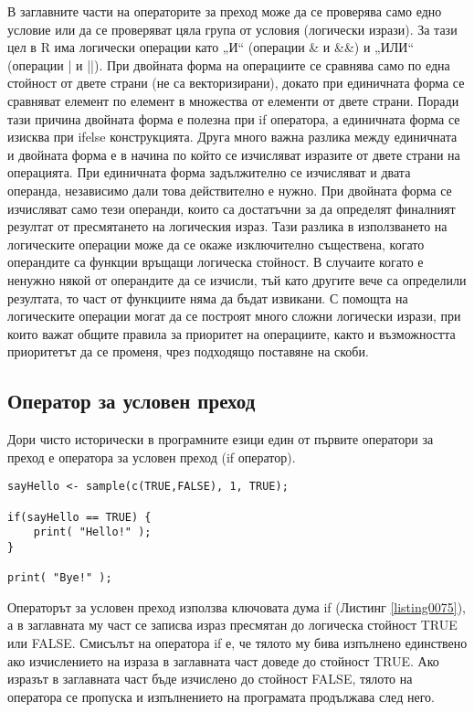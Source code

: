 В заглавните части на операторите за преход може да се проверява само едно условие или да се проверяват цяла група от условия (логически изрази). За тази цел в R има логически операции като „И“ (операции \& и \&\&) и „ИЛИ“ (операции | и ||). При двойната форма на операциите се сравнява само по една стойност от двете страни (не са векторизирани), докато при единичната форма се сравняват елемент по елемент в множества от елементи от двете страни. Поради тази причина двойната форма е полезна при if оператора, а единичната форма се изисква при ifelse конструкцията. Друга много важна разлика между единичната и двойната форма е в начина по който се изчисляват изразите от двете страни на операцията. При единичната форма задължително се изчисляват и двата операнда, независимо дали това действително е нужно. При двойната форма се изчисляват само тези операнди, които са достатъчни за да определят финалният резултат от пресмятането на логическия израз. Тази разлика в използването на логическите операции може да се окаже изключително съществена, когато операндите са функции връщащи логическа стойност. В случаите когато е ненужно някой от операндите да се изчисли, тъй като другите вече са определили резултата, то част от функциите няма да бъдат извикани. С помощта на логическите операции могат да се построят много сложни логически изрази, при които важат общите правила за приоритет на операциите, както и възможността приоритетът да се променя, чрез подходящо поставяне на скоби.

\subsection{Оператор за условен преход}

Дори чисто исторически в програмните езици един от първите оператори за преход е оператора за условен преход (if оператор).

\begin{lstlisting}[caption=Оператор за условен преход if, label=listing0075]
sayHello <- sample(c(TRUE,FALSE), 1, TRUE);

if(sayHello == TRUE) {
	print( "Hello!" );
}

print( "Bye!" );
\end{lstlisting}

Операторът за условен преход използва ключовата дума if (Листинг \ref{listing0075}), а в заглавната му част се записва израз пресмятан до логическа стойност TRUE или FALSE. Смисълът на оператора if е, че тялото му бива изпълнено единствено ако изчислението на израза в заглавната част доведе до стойност TRUE. Ако изразът в заглавната част бъде изчислено до стойност FALSE, тялото на оператора се пропуска и изпълнението на програмата продължава след него.

